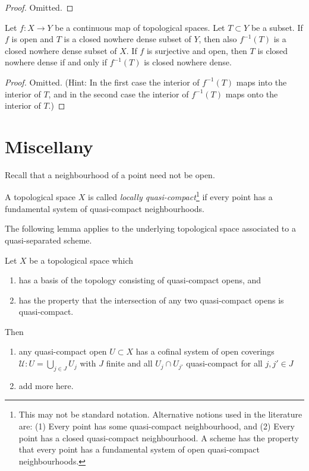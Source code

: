 \begin{proof}
Omitted.
\end{proof}

\begin{lemma}
\label{lemma-open-inverse-image-closed-nowhere-dense}
Let $f : X \to Y$ be a continuous map of topological spaces.
Let $T \subset Y$ be a subset.
If $f$ is open and $T$ is a closed nowhere dense subset of $Y$,
then also $f^{-1}(T)$ is a closed nowhere dense subset of $X$.
If $f$ is surjective and open, then
$T$ is closed nowhere dense if and only
if $f^{-1}(T)$ is closed nowhere dense.
\end{lemma}

\begin{proof}
Omitted. (Hint: In the first case the interior of $f^{-1}(T)$
maps into the interior of $T$, and in the second case the interior of
$f^{-1}(T)$ maps onto the interior of $T$.)
\end{proof}




\section{Miscellany}
\label{section-miscellany}

\noindent
Recall that a neighbourhood of a point need not be open.

\begin{definition}
\label{definition-locally-quasi-compact}
A topological space $X$ is called
{\it locally quasi-compact}\footnote{This may not be standard notation.
Alternative notions used in the literature are: (1) Every point has some
quasi-compact neighbourhood, and (2) Every point has a closed quasi-compact
neighbourhood. A scheme has the property that every point has a fundamental
system of open quasi-compact neighbourhoods.} if every
point has a fundamental system of quasi-compact neighbourhoods.
\end{definition}

\noindent
The following lemma applies to the underlying topological space
associated to a quasi-separated scheme.

\begin{lemma}
\label{lemma-topology-quasi-separated-scheme}
Let $X$ be a topological space which
\begin{enumerate}
\item has a basis of the topology consisting of quasi-compact opens, and
\item has the property that the intersection of any two quasi-compact
opens is quasi-compact.
\end{enumerate}
Then
\begin{enumerate}
\item any quasi-compact open $U \subset X$
has a cofinal system of open coverings
$\mathcal{U} : U = \bigcup_{j\in J} U_j$ with $J$ finite and
all $U_j \cap U_{j'}$ quasi-compact for all $j, j' \in J$
\item add more here.
\end{enumerate}
\end{lemma}

